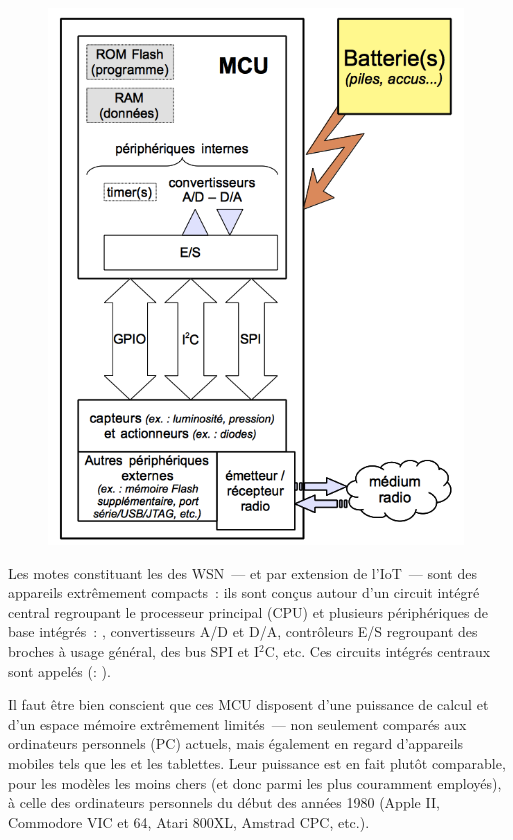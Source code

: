 \begin{figure}[!hbtp]
\centering
\includegraphics[width=11cm]{images/ch2-structure-mote.png}
\label{FigStructMote}
\end{figure}

Les motes constituant les  des WSN~--- et par extension
de l'IoT~--- sont des appareils extrêmement compacts~: ils sont conçus
autour d'un circuit intégré central regroupant le processeur principal
(CPU) et plusieurs périphériques de base intégrés~: ,
convertisseurs A/D et D/A, contrôleurs E/S regroupant des broches à
usage général, des bus SPI et I$^2$C, etc. Ces circuits intégrés
centraux sont appelés  (: ).

Il faut être bien conscient que ces MCU disposent d'une puissance
de calcul et d'un espace mémoire extrêmement limités~--- non seulement
comparés aux ordinateurs personnels (PC) actuels, mais également en
regard d'appareils mobiles tels que les  et les
tablettes. Leur puissance est en fait plutôt comparable, pour les
modèles les moins chers (et donc parmi les plus couramment employés),
à celle des ordinateurs personnels du début des années 1980 (Apple II,
Commodore VIC et 64, Atari 800XL, Amstrad CPC, etc.).

